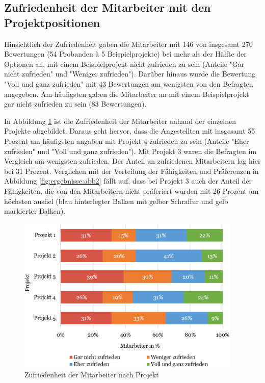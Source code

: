 \subsection{Zufriedenheit der Mitarbeiter mit den Projektpositionen}
Hinsichtlich der Zufriedenheit gaben die Mitarbeiter mit 146 von insgesamt 270 Bewertungen (54 Probanden \`{a} 5 Beispielprojekte) bei mehr als der Hälfte der Optionen an, mit einem Beispielprojekt nicht zufrieden zu sein (Anteile "Gar nicht zufrieden" und "Weniger zufrieden").
Darüber hinaus wurde die Bewertung "Voll und ganz zufrieden" mit 43 Bewertungen am wenigsten von den Befragten angegeben.
Am häufigsten gaben die Mitarbeiter an mit einem Beispielprojekt gar nicht zufrieden zu sein (83 Bewertungen).

In Abbildung \ref{fig:ergebnisse:abb3} ist die Zufriedenheit der Mitarbeiter anhand der einzelnen Projekte abgebildet.
Daraus geht hervor, dass die Angestellten mit insgesamt 55 Prozent am häufigsten angaben mit Projekt 4 zufrieden zu sein (Anteile "Eher zufrieden" und "Voll und ganz zufrieden").
Mit Projekt 3 waren die Befragten im Vergleich am wenigsten zufrieden.
Der Anteil an zufriedenen Mitarbeitern lag hier bei 31 Prozent.
Verglichen mit der Verteilung der Fähigkeiten und Präferenzen in Abbildung \ref{fig:ergebnisse:abb2} fällt auf, dass bei Projekt 3 auch der Anteil der Fähigkeiten, die von den Mitarbeitern nicht präferiert wurden mit 26 Prozent am höchsten ausfiel (blau hinterlegter Balken mit gelber Schraffur und gelb markierter Balken).

\begin{figure}[H]
    \centering
	\includegraphics[width=0.95\textwidth]{gfx/verteilung-z-nach-projekt.png}
	\caption[Zufriedenheit der Mitarbeiter nach Projekt]{Zufriedenheit der Mitarbeiter nach Projekt}
	\label{fig:ergebnisse:abb3}
\end{figure}

